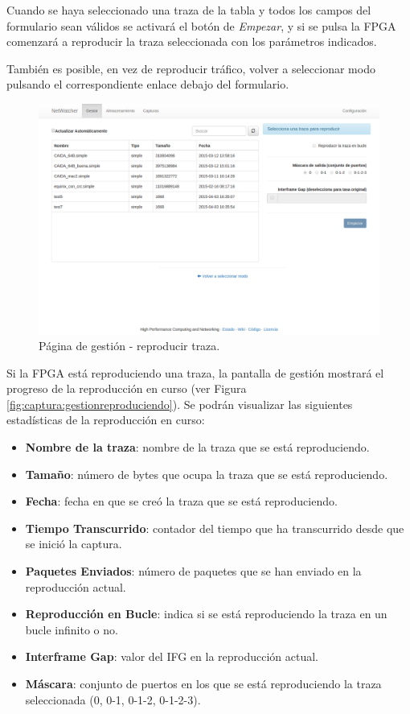 Cuando se haya seleccionado una traza de la tabla y todos los campos del formulario sean válidos se activará el botón de \textit{Empezar}, y si se pulsa la \gls{FPGA} comenzará a reproducir la \gls{traza} seleccionada con los parámetros indicados.

También es posible, en vez de reproducir tráfico, volver a seleccionar modo pulsando el correspondiente enlace debajo del formulario.

\begin{figure}[!htp]
  \centering
  \includegraphics[width=\textwidth,clip=true]{graphics/capturas/gestor_reproducir}
  \caption{Página de gestión - reproducir \gls{traza}.}
  \label{fig:captura:gestionreproducir}
\end{figure}

Si la \gls{FPGA} está reproduciendo una \gls{traza}, la pantalla de gestión mostrará el progreso de la reproducción en curso (ver Figura \ref{fig:captura:gestionreproduciendo}). Se podrán visualizar las siguientes estadísticas de la reproducción en curso:
\begin{itemize}
  \item \textbf{Nombre de la \gls{traza}}: nombre de la \gls{traza} que se está reproduciendo.
  \item \textbf{Tamaño}: número de bytes que ocupa la \gls{traza} que se está reproduciendo.
  \item \textbf{Fecha}: fecha en que se creó la \gls{traza} que se está reproduciendo.
  \item \textbf{Tiempo Transcurrido}: contador del tiempo que ha transcurrido desde que se inició la captura.
  \item \textbf{Paquetes Enviados}: número de paquetes que se han enviado en la reproducción actual.
  \item \textbf{Reproducción en Bucle}: indica si se está reproduciendo la \gls{traza} en un bucle infinito o no.
  \item \textbf{Interframe Gap}: valor del \gls{IFG} en la reproducción actual.
  \item \textbf{Máscara}: conjunto de puertos en los que se está reproduciendo la \gls{traza} seleccionada (0, 0-1, 0-1-2, 0-1-2-3).
\end{itemize}

